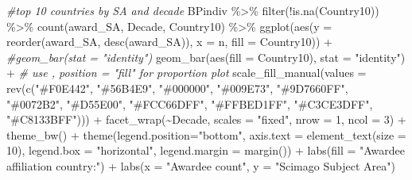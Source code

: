 \documentclass[
]{article}
\newenvironment{Shaded}{\begin{snugshade}}{\end{snugshade}}
\newcommand{\AttributeTok}[1]{\textcolor[rgb]{0.77,0.63,0.00}{#1}}
\newcommand{\CommentTok}[1]{\textcolor[rgb]{0.56,0.35,0.01}{\textit{#1}}}
\newcommand{\DecValTok}[1]{\textcolor[rgb]{0.00,0.00,0.81}{#1}}
\newcommand{\FunctionTok}[1]{\textcolor[rgb]{0.00,0.00,0.00}{#1}}
\newcommand{\NormalTok}[1]{#1}
\newcommand{\SpecialCharTok}[1]{\textcolor[rgb]{0.00,0.00,0.00}{#1}}
\newcommand{\StringTok}[1]{\textcolor[rgb]{0.31,0.60,0.02}{#1}}
\begin{document}
\begin{Shaded}
\begin{Highlighting}[]
\CommentTok{\#top 10 countries by SA and decade}
\NormalTok{BPindiv }\SpecialCharTok{\%\textgreater{}\%} 
  \FunctionTok{filter}\NormalTok{(}\SpecialCharTok{!}\FunctionTok{is.na}\NormalTok{(Country10)) }\SpecialCharTok{\%\textgreater{}\%} 
  \FunctionTok{count}\NormalTok{(award\_SA, Decade, Country10) }\SpecialCharTok{\%\textgreater{}\%} 
  \FunctionTok{ggplot}\NormalTok{(}\FunctionTok{aes}\NormalTok{(}\AttributeTok{y =} \FunctionTok{reorder}\NormalTok{(award\_SA, }\FunctionTok{desc}\NormalTok{(award\_SA)), }\AttributeTok{x =}\NormalTok{ n, }\AttributeTok{fill =}\NormalTok{ Country10)) }\SpecialCharTok{+}
  \CommentTok{\#geom\_bar(stat = "identity")}
  \FunctionTok{geom\_bar}\NormalTok{(}\FunctionTok{aes}\NormalTok{(}\AttributeTok{fill =}\NormalTok{ Country10), }\AttributeTok{stat =} \StringTok{"identity"}\NormalTok{) }\SpecialCharTok{+} \CommentTok{\# use , position = "fill" for proportion plot}
  \FunctionTok{scale\_fill\_manual}\NormalTok{(}\AttributeTok{values =} \FunctionTok{rev}\NormalTok{(}\FunctionTok{c}\NormalTok{(}\StringTok{"\#F0E442"}\NormalTok{, }\StringTok{"\#56B4E9"}\NormalTok{, }\StringTok{"\#000000"}\NormalTok{, }\StringTok{"\#009E73"}\NormalTok{, }\StringTok{"\#9D7660FF"}\NormalTok{, }\StringTok{"\#0072B2"}\NormalTok{, }\StringTok{"\#D55E00"}\NormalTok{, }\StringTok{"\#FCC66DFF"}\NormalTok{, }\StringTok{"\#FFBED1FF"}\NormalTok{, }\StringTok{"\#C3CE3DFF"}\NormalTok{, }\StringTok{"\#C8133BFF"}\NormalTok{))) }\SpecialCharTok{+}
    \FunctionTok{facet\_wrap}\NormalTok{(}\SpecialCharTok{\textasciitilde{}}\NormalTok{Decade, }\AttributeTok{scales =} \StringTok{"fixed"}\NormalTok{, }\AttributeTok{nrow =} \DecValTok{1}\NormalTok{, }\AttributeTok{ncol =} \DecValTok{3}\NormalTok{) }\SpecialCharTok{+}
  \FunctionTok{theme\_bw}\NormalTok{() }\SpecialCharTok{+} 
  \FunctionTok{theme}\NormalTok{(}\AttributeTok{legend.position=}\StringTok{"bottom"}\NormalTok{, }\AttributeTok{axis.text =} \FunctionTok{element\_text}\NormalTok{(}\AttributeTok{size =} \DecValTok{10}\NormalTok{), }\AttributeTok{legend.box =} \StringTok{"horizontal"}\NormalTok{, }\AttributeTok{legend.margin =} \FunctionTok{margin}\NormalTok{()) }\SpecialCharTok{+}
  \FunctionTok{labs}\NormalTok{(}\AttributeTok{fill =} \StringTok{"Awardee affiliation country:"}\NormalTok{) }\SpecialCharTok{+}
  \FunctionTok{labs}\NormalTok{(}\AttributeTok{x =} \StringTok{"Awardee count"}\NormalTok{, }\AttributeTok{y =} \StringTok{"Scimago Subject Area"}\NormalTok{)  }
\end{Highlighting}
\end{Shaded}
\end{document}

